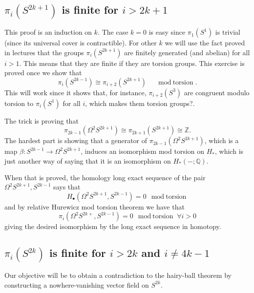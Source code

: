 \subsection{$\pi_{i}(S^{2k+1})$ is finite for $i>2k+1$}
This proof is an induction on $k$. The case $k=0$ is easy since $\pi_{1}(S^{1})$ is trivial (since its universal cover is contractible). For other $k$ we will use the fact proved in lectures that the groups $\pi_{i}(S^{2k+1})$ are finitely generated (and abelian) for all $i>1$. This means that they are finite if they are torsion groups. This exercise is proved once we show that
\begin{equation}\label{eq:1}
	\pi_{i}(S^{2k-1})\cong \pi_{i+2}(S^{2k+1})\quad \mod\text{torsion}.
\end{equation}
This will work since it shows that, for instance, $\pi_{i+2}(S^{3})$ are congruent {\color{magenta}modulo torsion} to $\pi_{i}(S^{1})$ for all $i$, which  {\color{magenta}makes them torsion groups?}.

The trick is proving that
\begin{equation}\label{eq:2}
	\pi_{2k-1}(\Omega^{2} S^{2k+1})\cong \pi_{2k+1}(S^{2k+1})\cong \mathbb{Z}.
\end{equation}
The hardest part is showing that a generator of $\pi_{2k-1}(\Omega^{2} S^{2k+1})$, which is a map $\beta:S^{2k-1}\to \Omega^{2} S^{2k+1}$, induces an isomorphism mod torsion on $H_{*}$, {\color{magenta}which is just another way of saying that it is an isomorphism on $H_{*}(-;\mathbb{Q})$}.

When that is proved, the homology long exact sequence of the pair $\Omega^{2}S^{2k+1},S^{2k-1}$ says that
\[H_\bullet(\Omega^{2} S^{2k+1},S^{2k-1})=0\mod \text{torsion} \]
and by relative Hurewicz mod torsion theorem we have that
\[\pi_{i}(\Omega^{2} S^{2k+},S^{2k-1})=0\mod\text{torsion}\; \forall i>0\]
giving the desired isomorphism by the long exact sequence in homotopy.

\subsection{$\pi_{i}(S^{2k})$ is finite for $i>2k$ and $i\neq 4k-1$}
Our objective will be to obtain a contradiction to the hairy-ball theorem by constructing a nowhere-vanishing vector field on $S^{2k}$.

